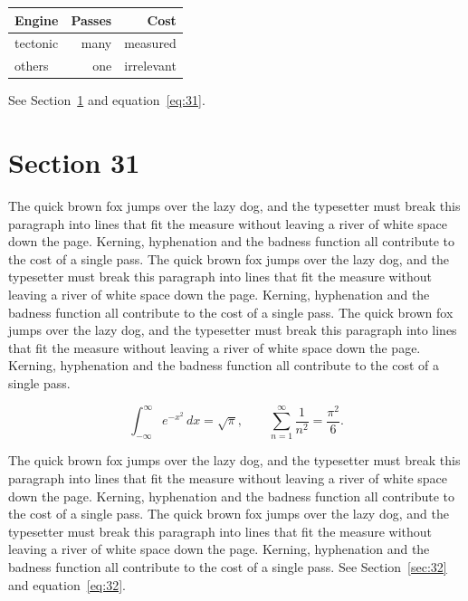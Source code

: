 \documentclass{article}
\begin{document}
\begin{center}
\begin{tabular}{lrr}
\toprule
Engine & Passes & Cost \\
\midrule
tectonic & many & measured \\
others & one & irrelevant \\
\bottomrule
\end{tabular}
\end{center}

See Section~\ref{sec:31} and equation~\eqref{eq:31}.
\section{Section 31}
\label{sec:31}
The quick brown fox jumps over the lazy dog, and the typesetter must break this paragraph into lines that fit the measure without leaving a river of white space down the page. Kerning, hyphenation and the badness function all contribute to the cost of a single pass. The quick brown fox jumps over the lazy dog, and the typesetter must break this paragraph into lines that fit the measure without leaving a river of white space down the page. Kerning, hyphenation and the badness function all contribute to the cost of a single pass. The quick brown fox jumps over the lazy dog, and the typesetter must break this paragraph into lines that fit the measure without leaving a river of white space down the page. Kerning, hyphenation and the badness function all contribute to the cost of a single pass. 

\begin{equation}\label{eq:31}
\int_{-\infty}^{\infty} e^{-x^{2}}\,dx = \sqrt{\pi}, \qquad
\sum_{n=1}^{\infty} \frac{1}{n^{2}} = \frac{\pi^{2}}{6}.
\end{equation}

The quick brown fox jumps over the lazy dog, and the typesetter must break this paragraph into lines that fit the measure without leaving a river of white space down the page. Kerning, hyphenation and the badness function all contribute to the cost of a single pass. The quick brown fox jumps over the lazy dog, and the typesetter must break this paragraph into lines that fit the measure without leaving a river of white space down the page. Kerning, hyphenation and the badness function all contribute to the cost of a single pass. 
See Section~\ref{sec:32} and equation~\eqref{eq:32}.
\end{document}
